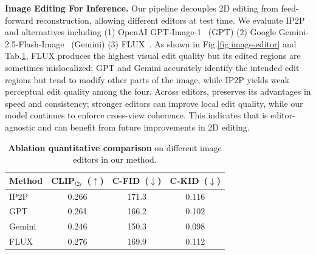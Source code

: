 \vspace{1mm}
\noindent\textbf{Image Editing For Inference.}
Our pipeline decouples 2D editing from feed-forward reconstruction, allowing different editors at test time. We evaluate IP2P~\cite{ip2p} and alternatives including (1) OpenAI GPT-Image-1~\cite{gpt4o} (GPT) (2) Google Gemini-2.5-Flash-Image~\cite{geminiteam2025geminifamilyhighlycapable} (Gemini) (3) FLUX~\cite{labs2025flux1kontextflowmatching}. 
As shown in Fig.\ref{fig:image-editor} and Tab.\ref{tab:image_editor}, FLUX produces the highest visual edit quality but its edited regions are sometimes mislocalized; GPT and Gemini accurately identify the intended edit regions but tend to modify other parts of the image, while IP2P yields weak perceptual edit quality among the four.
Across editors, {\ourmethod} preserves its advantages in speed and consistency; stronger editors can improve local edit quality, while our model continues to enforce cross-view coherence. This indicates that {\ourmethod} is editor-agnostic and can benefit from future improvements in 2D editing.

\begin{table}[t]
\centering
\scriptsize
\caption{\textbf{Ablation quantitative comparison} on different image editors in our method.}
\vspace{-2mm}
\label{tab:image_editor}
\setlength{\tabcolsep}{6pt}
\renewcommand{\arraystretch}{1.1}

\begin{tabular}{l@{\hskip 8.0mm}c@{\hskip 8.0mm}c@{\hskip 8.0mm}c}
\toprule
\textbf{Method} & \textbf{CLIP$_{t2i}$~(\(\uparrow\))} &
\textbf{C-FID~(\(\downarrow\))} & \textbf{C-KID~(\(\downarrow\))} \\
\midrule
IP2P~\cite{ip2p}  & 0.266 & 171.3 & 0.116 \\
GPT~\cite{gpt4o}    & 0.261 & 166.2 & 0.102 \\ Gemini~\cite{geminiteam2025geminifamilyhighlycapable}  & 0.246 & 150.3 & 0.098 \\
FLUX~\cite{labs2025flux1kontextflowmatching}  & 0.276 & 169.9 & 0.112 \\
\bottomrule
\end{tabular}
\vspace{-4mm}
\end{table}
%